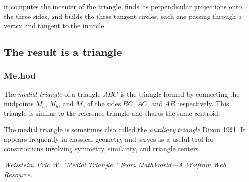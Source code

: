 it computes the incenter of the triangle,
finds its perpendicular projections onto the three sides,
and builds the three tangent circles, each one passing through a vertex and tangent to the incircle.

\begin{tkzexample}[latex=.45\textwidth]
\begin{center}
\end{center}
\end{tkzexample}




\subsection{The result is a triangle}
\subsubsection{Method } %
\label{ssub:method_triangle_medial}

The \emph{medial triangle} of a triangle $ABC$ is the triangle formed by connecting the midpoints $M_a$, $M_b$, and $M_c$ of the sides $BC$, $AC$, and $AB$ respectively. This triangle is similar to the reference triangle and shares the same centroid.

The medial triangle is sometimes also called the \emph{auxiliary triangle} Dixon 1991. It appears frequently in classical geometry and serves as a useful tool for constructions involving symmetry, similarity, and triangle centers.
\begin{flushright}
  \small
\href{https://mathworld.wolfram.com/MedialTriangle.html}
{\textit{Weisstein, Eric W. "Medial Triangle." From MathWorld—A Wolfram Web Resource.}}
\end{flushright}

